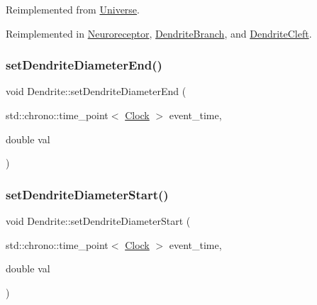 Reimplemented from \mbox{\hyperlink{classUniverse_aa22202ae740eb1355529afcb13285e91}{Universe}}.



Reimplemented in \mbox{\hyperlink{classNeuroreceptor_a0660a316ef44cf723509f720acd16f24}{Neuroreceptor}}, \mbox{\hyperlink{classDendriteBranch_a2ce03fbad4a70564eeaafb62debd4d74}{Dendrite\+Branch}}, and \mbox{\hyperlink{classDendriteCleft_a428b8e5117f381a382e0071b936d42a1}{Dendrite\+Cleft}}.

\mbox{\label{classDendrite_ada331daa4464ae007b3f77612aa46937}} 
\subsubsection{\texorpdfstring{set\+Dendrite\+Diameter\+End()}{setDendriteDiameterEnd()}}
{\footnotesize\ttfamily void Dendrite\+::set\+Dendrite\+Diameter\+End (\begin{DoxyParamCaption}\item[{std\+::chrono\+::time\+\_\+point$<$ \mbox{\hyperlink{universe_8h_a0ef8d951d1ca5ab3cfaf7ab4c7a6fd80}{Clock}} $>$}]{event\+\_\+time,  }\item[{double}]{val }\end{DoxyParamCaption})\hspace{0.3cm}{\ttfamily [inline]}}

\mbox{\label{classDendrite_af33658a5420b56cfd321d75ae5784302}} 
\subsubsection{\texorpdfstring{set\+Dendrite\+Diameter\+Start()}{setDendriteDiameterStart()}}
{\footnotesize\ttfamily void Dendrite\+::set\+Dendrite\+Diameter\+Start (\begin{DoxyParamCaption}\item[{std\+::chrono\+::time\+\_\+point$<$ \mbox{\hyperlink{universe_8h_a0ef8d951d1ca5ab3cfaf7ab4c7a6fd80}{Clock}} $>$}]{event\+\_\+time,  }\item[{double}]{val }\end{DoxyParamCaption})\hspace{0.3cm}{\ttfamily [inline]}}


